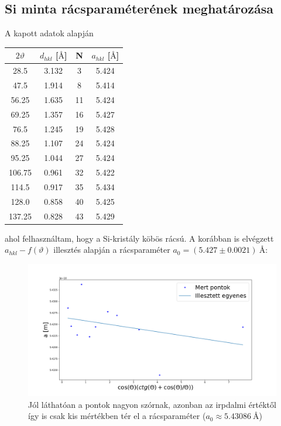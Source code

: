 \documentclass[a4paper,12pt]{article}
\begin{document}
\subsection{ Si minta rácsparaméterének meghatározása}

\par A kapott adatok alapján 

\begin{center}
\begin{tabular}{|c|c|c|c|}
\hline
$2\vartheta$ & $d_{hkl}$ [$\si{\angstrom}$] & N & $a_{hkl}$ [$\si{\angstrom}$]\\
\hline
28.5 &3.132 & 3 & 5.424\\
\hline
47.5 & 1.914 & 8 & 5.414 \\
\hline
56.25 & 1.635 & 11 & 5.424\\
\hline
69.25 & 1.357 & 16 & 5.427\\
\hline
76.5 & 1.245 & 19 & 5.428\\
\hline
88.25 & 1.107 & 24 & 5.424\\
\hline
95.25 & 1.044 & 27 & 5.424\\
\hline
106.75 & 0.961 & 32 & 5.422\\
\hline
114.5 & 0.917 & 35 & 5.434\\
\hline
128.0 & 0.858 &  40 & 5.425\\
\hline
137.25 & 0.828 & 43 & 5.429\\
\hline
\end{tabular}
\end{center}

\par ahol felhasználtam, hogy a Si-kristály köbös rácsú. A korábban is elvégzett $a_{hkl} - f(\vartheta)$ illesztés alapján a rácsparaméter $a_{0} = (5.427 \pm 0.0021) ~\si{\angstrom}$:

\begin{figure}[H]
\centering
\includegraphics[width=.88\textwidth]{./egyenesSi.png}
\caption{Jól láthatóan a pontok nagyon szórnak, azonban az irpdalmi értéktől így is csak kis mértékben tér el a rácsparaméter ($a_{0} \approx 5.43086 ~\si{\angstrom}$)}
\end{figure}
\end{document}
